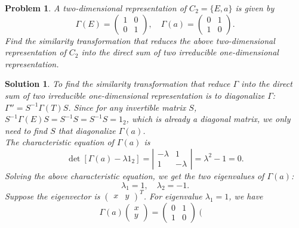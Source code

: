 \documentclass[UTF8,10pt,a4paper]{article}
\theoremstyle{Problem}
\newtheorem{prob}{Problem}
\theoremstyle{Solution}
\newtheorem*{sol}{Solution}
\begin{document}
\begin{prob}
    A two-dimensional representation of $C_2=\{E,a\}$ is given by
    \[
        \Gamma(E)=\left(\begin{matrix}
            1&0\\
            0&1
        \end{matrix}\right),\quad\Gamma(a)=\left(\begin{matrix}
            0&1\\
            1&0
        \end{matrix}\right).
    \]
    Find the similarity transformation that reduces the above two-dimensional representation of $C_2$ into the direct sum of two irreducible one-dimensional representation.
\end{prob}
\begin{sol}
    To find the similarity transformation that reduce $\Gamma$ into the direct sum of two irreducible one-dimensional representation is to diagonalize $\Gamma$: $\Gamma''=S^{-1}\Gamma(T)S$. Since for any invertible matrix $S$, $S^{-1}\Gamma(E)S=S^{-1}S=S^{-1}S=1_2$, which is already a diagonal matrix, we only need to find $S$ that diagonalize $\Gamma(a)$.\\
    The characteristic equation of $\Gamma(a)$ is
    \begin{equation}
        \det[\Gamma(a)-\lambda 1_2]=\left\lvert\begin{matrix}
            -\lambda&1\\
            1&-\lambda
        \end{matrix}\right\rvert=\lambda^2-1=0.
    \end{equation}
    Solving the above characteristic equation, we get the two eigenvalues of $\Gamma(a)$:
    \begin{equation}
        \lambda_1=1,\quad\lambda_2=-1.
    \end{equation}
    Suppose the eigenvector is $(\begin{matrix}
        x&y
    \end{matrix})^T$. For eigenvalue $\lambda_1=1$, we have
    \begin{equation}
        \Gamma(a)\left(\begin{matrix}
            x\\
            y
        \end{matrix}\right)=\left(\begin{matrix}
            0&1\\
            1&0
        \end{matrix}\right)\left(\begin{matrix}

\end{matrix}
\end{equation}
\end{sol}
\end{document}
